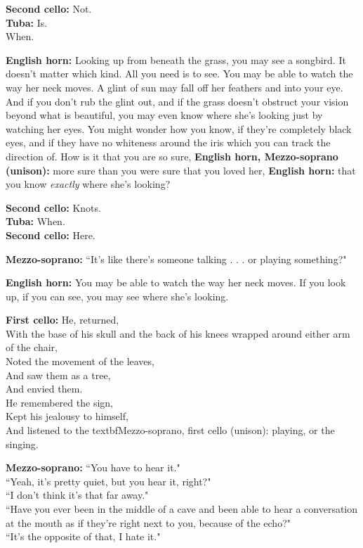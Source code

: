 \documentclass[11pt]{article}
\begin{document}
\begingroup
\textbf{Second cello:} Not. \\ \textbf{Tuba:} Is. \\ When.
\endgroup

\begingroup
\textbf{English horn:} Looking up from beneath the grass, you may see a songbird. It doesn't matter which kind. All you need is to see. You may be able to watch the way her neck moves. A glint of sun may fall off her feathers and into your eye. And if you don't rub the glint out, and if the grass doesn't obstruct your vision beyond what is beautiful, you may even know where she's looking just by watching her eyes. You might wonder how you know, if they're completely black eyes, and if they have no whiteness around the iris which you can track the direction of. How is it that you are so sure, \textbf{English horn, Mezzo-soprano (unison):} more sure than you were sure that you loved her, \textbf{English horn:} that you know \textit{exactly} where she's looking?
\endgroup

\begingroup
\textbf{Second cello:} Knots. \\ \textbf{Tuba:} When. \\ \textbf{Second cello:} Here.
\endgroup

\begingroup
\textbf{Mezzo-soprano:} ``It's like there's someone talking . . . or playing something?"
\endgroup

\begingroup
\textbf{English horn:} You may be able to watch the way her neck moves. If you look up, if you can see, you may see where she's looking.
\endgroup

\begingroup
\textbf{First cello:} He, returned, \\ With the base of his skull and the back of his knees wrapped around either arm of the chair, \\ Noted the movement of the leaves, \\ And saw them as a tree, \\ And envied them. \\ He remembered the sign, \\ Kept his jealousy to himself, \\ And listened to the textbf{Mezzo-soprano, first cello (unison):} playing, or the singing.
\endgroup

\begingroup
\textbf{Mezzo-soprano:} ``You have to hear it." \\ ``Yeah, it's pretty quiet, but you hear it, right?" \\ ``I don't think it's that far away." \\ ``Have you ever been in the middle of a cave and been able to hear a conversation at the mouth as if they're right next to you, because of the echo?" \\ ``It's the opposite of that, I hate it."
\endgroup
\end{document}
